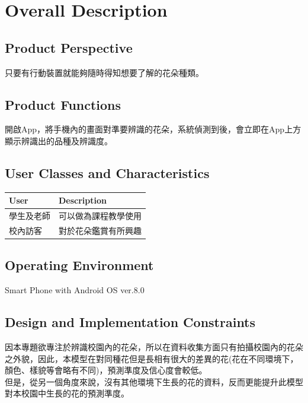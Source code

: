 \documentclass{scrreprt}
\begin{document}
\chapter{Overall Description}

\section{Product Perspective}
\begin{CJK}{UTF8}{bkai}
只要有行動裝置就能夠隨時得知想要了解的花朵種類。
\end{CJK}

\section{Product Functions}
\begin{CJK}{UTF8}{bkai}
	開啟App，將手機內的畫面對準要辨識的花朵，系統偵測到後，會立即在App上方顯示辨識出的品種及辨識度。
\end{CJK}

\section{User Classes and Characteristics}
\begin{center}
	\begin{CJK}{UTF8}{bkai}
		
		\begin{tabular}{| l | l |}
		\hline
			\rowcolor{gray}User & Description \\ \hline
			學生及老師 & 可以做為課程教學使用  \\ \hline
			校內訪客 & 對於花朵鑑賞有所興趣 \\ \hline
		\end{tabular}
	\end{CJK}
\end{center}

\section{Operating Environment}
Smart Phone with Android OS ver.8.0 

\section{Design and Implementation Constraints}
\begin{CJK}{UTF8}{bkai}
	因本專題欲專注於辨識校園內的花朵，所以在資料收集方面只有拍攝校園內的花朵之外貌，因此，本模型在對同種花但是長相有很大的差異的花(花在不同環境下，顏色、樣貌等會略有不同)，預測準度及信心度會較低。 \\
	但是，從另一個角度來說，沒有其他環境下生長的花的資料，反而更能提升此模型對本校園中生長的花的預測準度。
\end{CJK}
\end{document}
